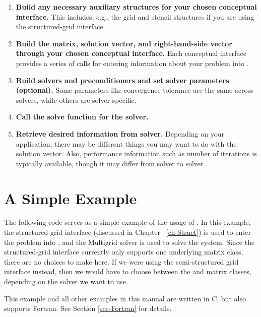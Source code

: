 \begin{enumerate}

\item
{\bf Build any necessary auxiliary structures for your chosen
conceptual interface.} This includes, e.g., the grid and stencil
structures if you are using the structured-grid interface.

\item
{\bf Build the matrix, solution vector, and right-hand-side vector
through your chosen conceptual interface.}  Each conceptual interface
provides a series of calls for entering information about your problem
into \hypre{}.

\item
{\bf Build solvers and preconditioners and set solver parameters
(optional).}  Some parameters like convergence tolerance are the same
across solvers, while others are solver specific.

\item
{\bf Call the solve function for the solver.}

\item
{\bf Retrieve desired information from solver.} Depending on your
application, there may be different things you may want to do with the
solution vector.  Also, performance information such as number of
iterations is typically available, though it may differ from solver to
solver.

\end{enumerate}


\section{A Simple Example}
\label{sec-Simple-Example}

The following code serves as a simple example of the usage of \hypre{}.  In
this example, the structured-grid interface (discussed in Chapter
~\ref{ch-Struct}) is used to enter the problem into \hypre{}, and the
 Multigrid solver is used to solve the system.  Since the
structured-grid interface currently only supports one underlying matrix class,
there are no choices to make here.  If we were using the semi-structured grid
interface instead, then we would have to choose between the  and
 matrix classes, depending on the solver we want to use.

This example and all other examples in this manual are written in C,
but \hypre{} also supports Fortran.  See Section
\ref{sec-Fortran} for details.

